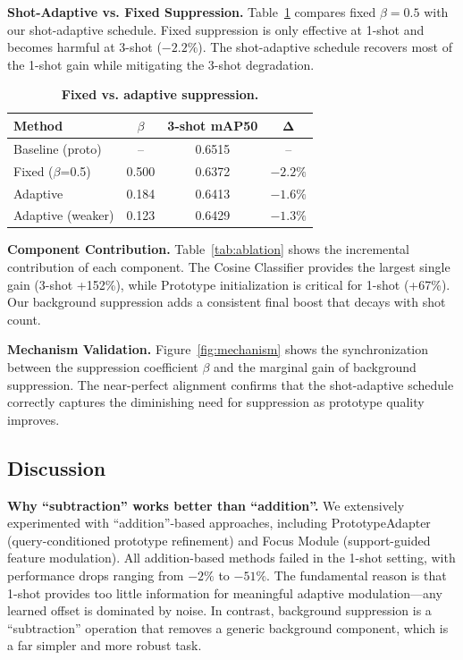 \documentclass[10pt,twocolumn,letterpaper]{article}
\begin{document}
\textbf{Shot-Adaptive vs. Fixed Suppression.}
Table~\ref{tab:fixed_vs_adaptive} compares fixed $\beta=0.5$ with our shot-adaptive schedule.
Fixed suppression is only effective at 1-shot and becomes harmful at 3-shot ($-2.2\%$).
The shot-adaptive schedule recovers most of the 1-shot gain while mitigating the
3-shot degradation.

\begin{table}[t]
\centering
\caption{\textbf{Fixed vs. adaptive suppression.}}
\label{tab:fixed_vs_adaptive}
\begin{tabular}{lccc}
\toprule
\textbf{Method} & $\beta$ & \textbf{3-shot mAP50} & $\mathbf{\Delta}$ \\
\midrule
Baseline (proto) & -- & 0.6515 & -- \\
Fixed ($\beta$=0.5) & 0.500 & 0.6372 & $-2.2\%$ \\
Adaptive & 0.184 & 0.6413 & $-1.6\%$ \\
Adaptive (weaker) & 0.123 & 0.6429 & $-1.3\%$ \\
\bottomrule
\end{tabular}
\end{table}

\textbf{Component Contribution.}
Table~\ref{tab:ablation} shows the incremental contribution of each component.
The Cosine Classifier provides the largest single gain (3-shot +152\%),
while Prototype initialization is critical for 1-shot (+67\%).
Our background suppression adds a consistent final boost that decays with shot count.

\textbf{Mechanism Validation.}
Figure~\ref{fig:mechanism} shows the synchronization between the suppression coefficient
$\beta$ and the marginal gain of background suppression. The near-perfect alignment
confirms that the shot-adaptive schedule correctly captures the diminishing need
for suppression as prototype quality improves.

\subsection{Discussion}

\textbf{Why ``subtraction'' works better than ``addition''.}
We extensively experimented with ``addition''-based approaches, including
PrototypeAdapter (query-conditioned prototype refinement) and Focus Module
(support-guided feature modulation). All addition-based methods failed in the
1-shot setting, with performance drops ranging from $-2\%$ to $-51\%$.
The fundamental reason is that 1-shot provides too little information for
meaningful adaptive modulation---any learned offset is dominated by noise.
In contrast, background suppression is a ``subtraction'' operation that removes
a generic background component, which is a far simpler and more robust task.
\end{document}
